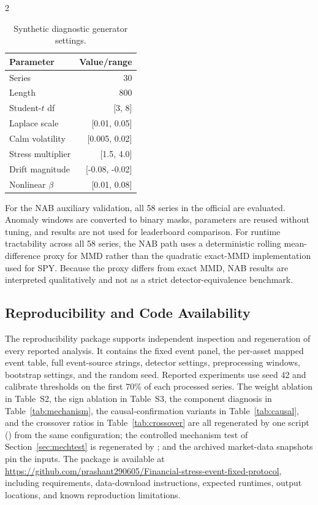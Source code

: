 \documentclass{book}
\begin{document}
\begin{multicols}{2}
\begin{table}[H]
\centering
\caption{Synthetic diagnostic generator settings.}
\label{tab:synthetic_params}
\scriptsize
\begin{tabular}{lr}
\toprule
Parameter & Value/range\\
\midrule
Series & 30\\
Length & 800\\
Student-$t$ df & [3, 8]\\
Laplace scale & [0.01, 0.05]\\
Calm volatility & [0.005, 0.02]\\
Stress multiplier & [1.5, 4.0]\\
Drift magnitude & [-0.08, -0.02]\\
Nonlinear $\beta$ & [0.01, 0.08]\\
\bottomrule
\end{tabular}
\end{table}

For the NAB auxiliary validation, all 58 series in the official  are evaluated. Anomaly windows are converted to binary masks, parameters are reused without tuning, and results are not used for leaderboard comparison. For runtime tractability across all 58 series, the NAB path uses a deterministic rolling mean-difference proxy for MMD rather than the quadratic exact-MMD implementation used for SPY. Because the proxy differs from exact MMD, NAB results are interpreted qualitatively and not as a strict detector-equivalence benchmark.

\subsection{Reproducibility and Code Availability}
\sloppy The reproducibility package supports independent inspection and regeneration of every reported analysis. It contains the fixed event panel, the per-asset mapped event table, full event-source strings, detector settings, preprocessing windows, bootstrap settings, and the random seed. Reported experiments use seed 42 and calibrate thresholds on the first 70\% of each processed series. The weight ablation in Table~S2, the sign ablation in Table~S3, the component diagnosis in Table~\ref{tab:mechanism}, the causal-confirmation variants in Table~\ref{tab:causal}, and the crossover ratios in Table~\ref{tab:crossover} are all regenerated by one script () from the same configuration; the controlled mechanism test of Section~\ref{sec:mechtest} is regenerated by ; and the archived market-data snapshots pin the inputs. The package is available at \url{https://github.com/prashant290605/Financial-stress-event-fixed-protocol}, including requirements, data-download instructions, expected runtimes, output locations, and known reproduction limitations.
\end{multicols}
\end{document}
